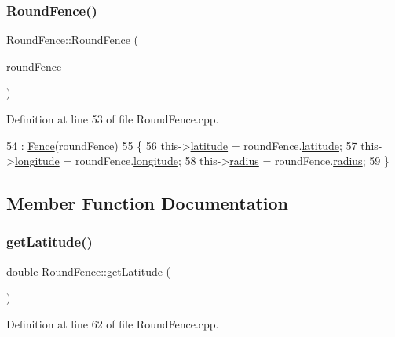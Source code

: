 \subsubsection{\texorpdfstring{Round\+Fence()}{RoundFence()}\hspace{0.1cm}{\footnotesize\ttfamily [3/3]}}
{\footnotesize\ttfamily Round\+Fence\+::\+Round\+Fence (\begin{DoxyParamCaption}\item[{const \hyperlink{class_round_fence}{Round\+Fence} \&}]{round\+Fence }\end{DoxyParamCaption})}



Definition at line 53 of file Round\+Fence.\+cpp.


\begin{DoxyCode}
54         : \hyperlink{class_fence_a5c2be718e885ed9ae2ca048406d126b3}{Fence}(roundFence)
55 \{
56     this->\hyperlink{class_round_fence_ad48cb4c95dab320652679bae203b7caf}{latitude} = roundFence.\hyperlink{class_round_fence_ad48cb4c95dab320652679bae203b7caf}{latitude};
57     this->\hyperlink{class_round_fence_a122cccc61f294c1fcdf7ebe944944fca}{longitude} = roundFence.\hyperlink{class_round_fence_a122cccc61f294c1fcdf7ebe944944fca}{longitude};
58     this->\hyperlink{class_round_fence_a8e9d1a2f22df0bb718522f3ab6cd3b83}{radius} = roundFence.\hyperlink{class_round_fence_a8e9d1a2f22df0bb718522f3ab6cd3b83}{radius};
59 \}
\end{DoxyCode}


\subsection{Member Function Documentation}
\mbox{\label{class_round_fence_a5981188ace99620634c843cc42da9bfc}} 
\subsubsection{\texorpdfstring{get\+Latitude()}{getLatitude()}}
{\footnotesize\ttfamily double Round\+Fence\+::get\+Latitude (\begin{DoxyParamCaption}{ }\end{DoxyParamCaption})}



Definition at line 62 of file Round\+Fence.\+cpp.


